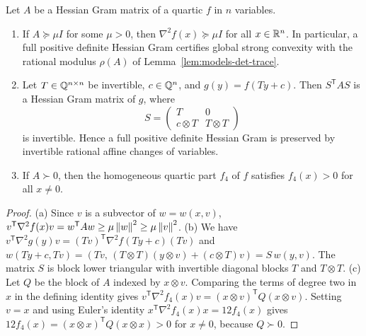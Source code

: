 \begin{lemma}
\label{lem:models-gram-curvature}\label{lem:models-hessian-gram}
Let $A$ be a Hessian Gram matrix of a quartic $f$ in $n$ variables.
\begin{enumerate}[label=(\alph*)]
\item If $A\succeq\mu I$ for some $\mu>0$, then $\nabla^2f(x)\succeq\mu I$ for
  all $x\in\mathbb R^n$. In particular, a full positive definite Hessian Gram
  certifies global strong convexity with the rational modulus $\rho(A)$ of
  Lemma~\ref{lem:models-det-trace}.
\item Let $T\in\mathbb Q^{n\times n}$ be invertible, $c\in\mathbb Q^n$, and
  $g(y)=f(Ty+c)$. Then $S^{\mathsf T}AS$ is a Hessian Gram matrix of $g$,
  where
  \[
  S=\begin{pmatrix}T&0\\ c\otimes T&T\otimes T\end{pmatrix}
  \]
  is invertible. Hence a full positive definite Hessian Gram is preserved by
  invertible rational affine changes of variables.
\item If $A\succ0$, then the homogeneous quartic part $f_4$ of $f$ satisfies
  $f_4(x)>0$ for all $x\ne0$.
\end{enumerate}
\end{lemma}

\begin{proof}
(a) Since $v$ is a subvector of $w=w(x,v)$,
$v^{\mathsf T}\nabla^2f(x)v=w^{\mathsf T}Aw\ge\mu\left\lVert w\right\rVert^2\ge\mu\left\lVert v\right\rVert^2$.
(b) We have $v^{\mathsf T}\nabla^2g(y)v=(Tv)^{\mathsf T}\nabla^2f(Ty+c)(Tv)$
and
$w(Ty+c,Tv)=(Tv,\,(T\otimes T)(y\otimes v)+(c\otimes T)v)=S\,w(y,v)$. The
matrix $S$ is block lower triangular with invertible diagonal blocks $T$ and
$T\otimes T$. (c) Let $Q$ be the block of $A$ indexed by $x\otimes v$.
Comparing the terms of degree two in $x$ in the defining identity gives
$v^{\mathsf T}\nabla^2f_4(x)v=(x\otimes v)^{\mathsf T}Q(x\otimes v)$. Setting
$v=x$ and using Euler's identity
$x^{\mathsf T}\nabla^2f_4(x)x=12f_4(x)$ gives
$12f_4(x)=(x\otimes x)^{\mathsf T}Q(x\otimes x)>0$ for $x\ne0$, because
$Q\succ0$.
\end{proof}

